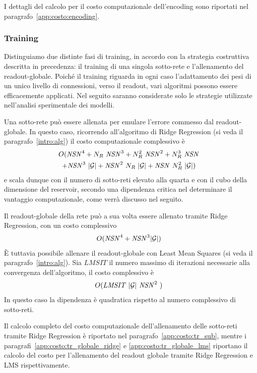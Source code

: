 I dettagli del calcolo per il costo computazionale dell'encoding sono riportati nel paragrafo~\ref{app:costo:encoding}.

\subsubsection*{Training}
Distinguiamo due distinte fasi di training, in accordo con la strategia costruttiva descritta in precedenza: il training di una singola sotto-rete e l'allenamento del readout-globale. Poiché il training riguarda in ogni caso l'adattamento dei pesi di un unico livello di connessioni, verso il readout, vari algoritmi possono essere efficacemente applicati. Nel seguito saranno considerate solo le strategie utilizzate nell'analisi sperimentale dei modelli.

Una sotto-rete può essere allenata per emulare l'errore commesso dal readout-globale. In questo caso, ricorrendo all'algoritmo di Ridge Regression (si veda il paragrafo~\ref{intro:alg}) il costo computazionale complessivo è 
\begin{multline}
	O( \mathit{NSN}^4 + N_R\ \mathit{NSN}^3 + N_R^2\ \mathit{NSN}^2 + N_R^3\ \mathit{NSN} \\ 
	+ \mathit{NSN}^3\ \abs{\mathcal{G}} + \mathit{NSN}^2\ N_R\ \abs{\mathcal{G}} + \mathit{NSN}\ N_R^2\ \abs{\mathcal{G}} )
\end{multline}
e scala dunque con il numero di sotto-reti elevato alla quarta e con il cubo della dimensione del reservoir, secondo una dipendenza critica nel determinare il vantaggio computazionale, come verrà discusso nel seguito.

Il readout-globale della rete può a sua volta essere allenato tramite Ridge Regression, con un costo complessivo
\begin{equation}
	O( \mathit{NSN}^4 + \mathit{NSN}^3 \lvert\mathcal{G}\rvert )
\end{equation}
\`E tuttavia possibile allenare il readout-globale con Least Mean Squares (si veda il paragrafo~\ref{intro:alg}). Sia $\mathit{LMSIT}$ il numero massimo di iterazioni necessarie alla convergenza dell'algoritmo, il costo complessivo è 
\begin{equation}
	O( \mathit{LMSIT}\ \lvert\mathcal{G}\rvert\ \mathit{NSN}^2\ )
\end{equation}
In questo caso la dipendenza è quadratica rispetto al numero complessivo di sotto-reti.

Il calcolo completo del costo computazionale dell'allenamento delle sotto-reti tramite Ridge Regression è riportato nel paragrafo~\ref{app:costo:tr_sub}, mentre i paragrafi~\ref{app:costo:tr_globale_ridge} e \ref{app:costo:tr_globale_lms} riportano il calcolo del costo per l'allenamento del readout globale tramite Ridge Regression e LMS rispettivamente.

